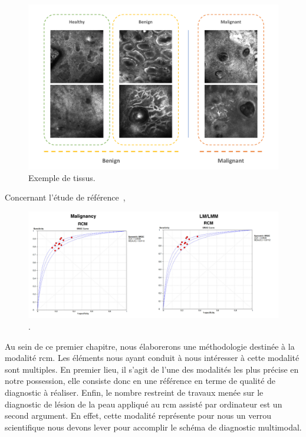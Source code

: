 \begin{figure}[H]
    \begin{center}
        \includegraphics[width=\linewidth]{contents/x_microscopy/resources/example_rcm_data.pdf}
        \caption{Exemple de tissus.}
        \label{fig:example_rcm_data}
    \end{center} 
\end{figure}\par


Concernant l'étude de référence~\cite{Cinotti2018}, 
\begin{figure}[H]
    \begin{center}
        \includegraphics[width=\linewidth]{contents/x_microscopy/resources/results_rcm_experts.png}
        \caption{.}
        \label{fig:results_rcm_experts}
    \end{center} 
\end{figure}\par


Au sein de ce premier chapitre, nous élaborerons une méthodologie destinée à la modalité \gls{rcm}. Les éléments nous ayant conduit à nous intéresser à cette modalité sont multiples. En premier lieu, il s'agit de l'une des modalités les plus précise en notre possession, elle consiste donc en une référence en terme de qualité de diagnostic à réaliser. Enfin, le nombre restreint de travaux menée sur le diagnostic de lésion de la peau appliqué au \gls{rcm} assisté par ordinateur est un second argument. En effet, cette modalité représente pour nous un verrou scientifique nous devons lever pour accomplir le schéma de diagnostic multimodal.\par

